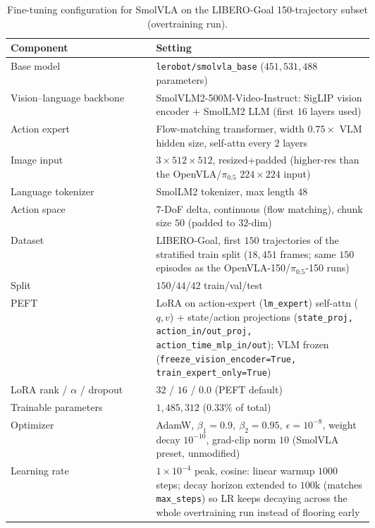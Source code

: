\documentclass[english,12pt,a4paper,pdftex,elec,utf8]{aaltothesis}
\begin{document}
\begin{table}[t]
  \centering\small
  \caption{Fine-tuning configuration for SmolVLA on the LIBERO-Goal 150-trajectory subset (overtraining run).}
  \label{tab:hparams_smolvla}
  \begin{tabular}{@{}l p{0.60\linewidth}@{}}
    \toprule
    Component & Setting \\
    \midrule
    Base model                & \texttt{lerobot/smolvla\_base} ($451{,}531{,}488$ parameters) \\
    Vision--language backbone & SmolVLM2-500M-Video-Instruct: SigLIP vision encoder + SmolLM2 LLM (first $16$ layers used) \\
    Action expert              & Flow-matching transformer, width $0.75\times$ VLM hidden size, self-attn every $2$ layers \\
    Image input                & $3\times512\times512$, resized+padded (higher-res than the OpenVLA/$\pi_{0.5}$ $224{\times}224$ input) \\
    Language tokenizer         & SmolLM2 tokenizer, max length $48$ \\
    Action space                & $7$-DoF delta, continuous (flow matching), chunk size $50$ (padded to $32$-dim) \\
    Dataset                    & LIBERO-Goal, first $150$ trajectories of the stratified train split ($18{,}451$ frames; same $150$ episodes as the OpenVLA-150/$\pi_{0.5}$-150 runs) \\
    Split                      & $150/44/42$ train/val/test  \\
    \midrule
    PEFT                       & LoRA on action-expert (\texttt{lm\_expert}) self-attn ($q,v$) + state/action projections (\texttt{state\_proj, action\_in/out\_proj, action\_time\_mlp\_in/out}); VLM frozen (\texttt{freeze\_vision\_encoder=True, train\_expert\_only=True}) \\
    LoRA rank / $\alpha$ / dropout & $32$ / $16$ / $0.0$ (PEFT default) \\
    Trainable parameters       & $1{,}485{,}312$ ($0.33\%$ of total) \\
    Optimizer                  & AdamW, $\beta_1{=}0.9,\ \beta_2{=}0.95,\ \epsilon{=}10^{-8}$, weight decay $10^{-10}$, grad-clip norm $10$ (SmolVLA preset, unmodified) \\
    Learning rate              & $1\times10^{-4}$ peak, cosine: linear warmup $1000$ steps; decay horizon extended to $100\text{k}$ (matches \texttt{max\_steps}) so LR keeps decaying across the whole overtraining run instead of flooring early \\

\end{tabular}
\end{table}
\end{document}
